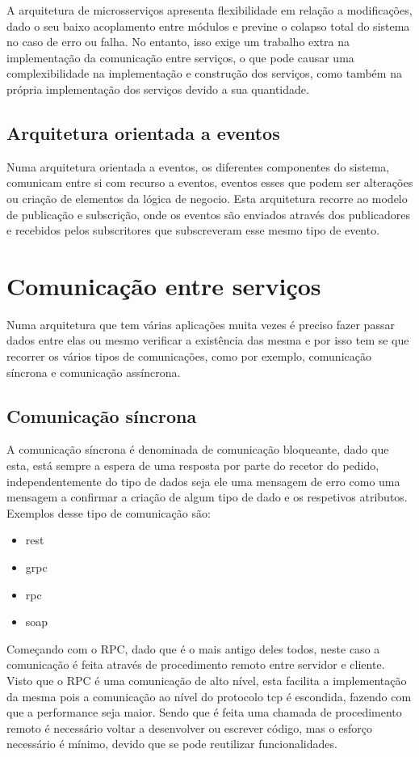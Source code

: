 A arquitetura de microsserviços apresenta flexibilidade em relação a modificações, dado o seu baixo acoplamento entre módulos e previne o colapso total do sistema no caso de erro ou falha. No entanto, isso exige um trabalho extra na implementação da comunicação entre serviços, o que pode causar uma complexibilidade na implementação e construção dos serviços, como também na própria implementação dos serviços devido a sua quantidade.

\subsection{Arquitetura orientada a eventos}

Numa arquitetura orientada a eventos, os diferentes componentes do sistema, comunicam entre si com recurso a eventos, eventos esses que podem ser alterações ou criação de elementos da lógica de negocio. Esta arquitetura recorre ao modelo de publicação e subscrição, onde os eventos são enviados através dos publicadores e recebidos pelos subscritores que subscreveram esse mesmo tipo de evento.

\section{Comunicação entre serviços}

Numa arquitetura que tem várias aplicações muita vezes é preciso fazer passar dados entre elas ou mesmo verificar a existência das mesma e por isso tem se que recorrer os vários tipos de comunicações, como por exemplo, comunicação síncrona e comunicação assíncrona. 

\subsection{Comunicação síncrona}

A comunicação síncrona é denominada de comunicação bloqueante, dado que esta, está sempre a espera de uma resposta por parte do recetor do pedido, independentemente do tipo de dados seja ele uma mensagem de erro como uma mensagem a confirmar a criação de algum tipo de dado e os respetivos atributos.
Exemplos desse tipo de comunicação são: 
\begin{itemize}
    \item \ac{rest}
    \item \ac{grpc}
    \item \ac{rpc}
    \item \ac{soap}
\end{itemize}
Começando com o RPC, dado que é o mais antigo deles todos, neste caso a comunicação é feita através de procedimento remoto entre servidor e cliente. Visto que o RPC é uma comunicação de alto nível, esta facilita a implementação da mesma pois a comunicação ao nível do protocolo \ac{tcp} é escondida, fazendo com que a performance seja maior. Sendo que é feita uma chamada de procedimento remoto é necessário voltar a desenvolver ou escrever código, mas o esforço necessário é mínimo, devido que se pode reutilizar funcionalidades.

